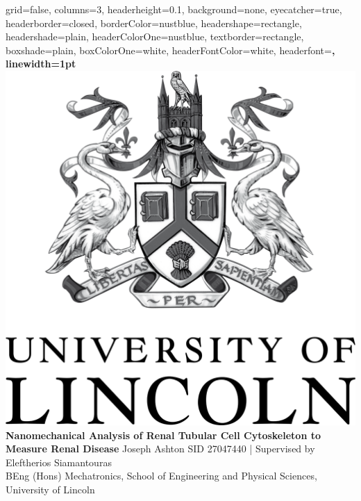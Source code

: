 \documentclass[a0paper,portrait]{baposter}
\begin{document}
\begin{poster}{
  grid=false,
  columns=3,
  headerheight=0.1\textheight,
  background=none,
  eyecatcher=true,
  headerborder=closed,
  borderColor=nustblue,
  headershape=rectangle,
  headershade=plain,
  headerColorOne=nustblue,
  textborder=rectangle,
  boxshade=plain,
  boxColorOne=white,
  headerFontColor=white,
  headerfont=\Large\sf\bf,
  linewidth=1pt
}
{
  \includegraphics[height=0.90\headerheight]{images/UoL_logo.png}
}
{\color{nustblue}\bf
    Nanomechanical Analysis of Renal Tubular 
    Cell Cytoskeleton to Measure Renal Disease
}
{\small
  \vspace{1em} Joseph Ashton \quad SID 27047440 \qquad | \qquad Supervised by Eleftherios Siamantouras\\[0.5em]
  BEng (Hons) Mechatronics, School of Engineering and Physical Sciences, University of Lincoln\\
}
{
  
}


\end{poster}
\end{document}
